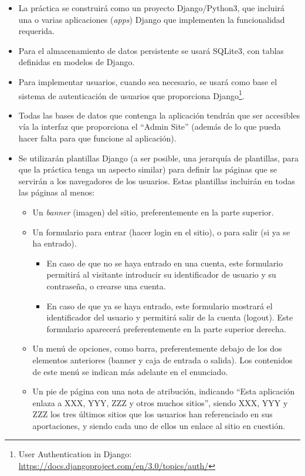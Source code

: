\begin{itemize}

\item La práctica se construirá como un proyecto Django/Python3, que incluirá una o varias aplicaciones (\emph{apps}) Django que implementen la funcionalidad requerida.

\item Para el almacenamiento de datos persistente se usará SQLite3, con tablas definidas en modelos de Django.

\item Para implementar usuarios, cuando sea necesario, se usará como base el sistema de autenticación de usuarios que proporciona Django\footnote{User Authentication in Django:\\ \url{https://docs.djangoproject.com/en/3.0/topics/auth/}}.

\item Todas las bases de datos que contenga la aplicación tendrán que ser accesibles vía la interfaz que proporciona el ``Admin Site'' (además de lo que pueda hacer falta para que funcione al aplicación).

\item Se utilizarán plantillas Django (a ser posible, una jerarquía de plantillas, para que la práctica tenga un aspecto similar) para definir las páginas que se servirán a los navegadores de los usuarios. Estas plantillas incluirán en todas las páginas al menos:

  \begin{itemize}
  \item Un \emph{banner} (imagen) del sitio, preferentemente en la parte superior.
  \item Un formulario para entrar (hacer login en el sitio), o para salir (si ya se ha entrado).
    \begin{itemize}
    \item En caso de que no se haya entrado en una cuenta, este formulario permitirá al visitante introducir su identificador de usuario y su contraseña, o crearse una cuenta.
    \item En caso de que ya se haya entrado, este formulario mostrará el identificador del usuario y permitirá salir de la cuenta (logout). Este formulario aparecerá preferentemente en la parte superior derecha.
    \end{itemize}
  \item Un menú de opciones, como barra, preferentemente debajo de los dos elementos anteriores (banner y caja de entrada o salida). Los contenidos de este menú se indican más adelante en el enunciado.
  \item Un pie de página con una nota de atribución, indicando ``Esta aplicación enlaza a XXX, YYY, ZZZ y otros muchos sitios'', siendo XXX, YYY y ZZZ los tres últimos sitios que los usuarios han referenciado en sus aportaciones, y siendo cada uno de ellos un enlace al sitio en cuestión.
  \end{itemize}


\end{itemize}
